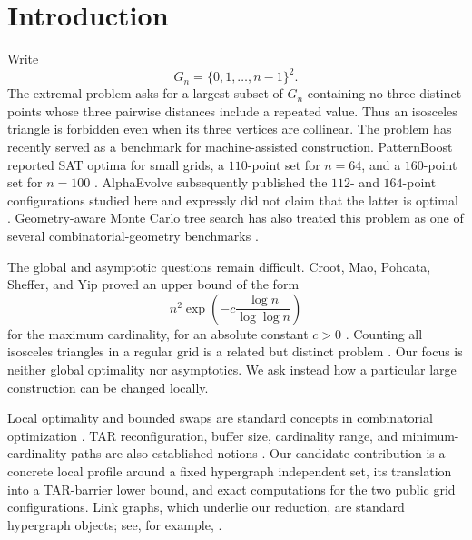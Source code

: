 \documentclass[11pt]{article}
\theoremstyle{definition}
\theoremstyle{remark}
\begin{document}
\section{Introduction}

Write
\[
  G_n=\{0,1,\ldots,n-1\}^2.
\]
The extremal problem asks for a largest subset of $G_n$ containing no three
distinct points whose three pairwise distances include a repeated value.
Thus an isosceles triangle is forbidden even when its three vertices are
collinear.  The problem has recently served as a benchmark for machine-assisted
construction.  PatternBoost reported SAT optima for small grids, a
$110$-point set for $n=64$, and a $160$-point set for $n=100$
\cite{charton2024patternboost}.  AlphaEvolve subsequently published the
$112$- and $164$-point configurations studied here and expressly did not claim
that the latter is optimal \cite{georgiev2025exploration,alphaevolve59}.
Geometry-aware Monte Carlo tree search has also treated this problem as one of
several combinatorial-geometry benchmarks \cite{zhang2026geometry}.

The global and asymptotic questions remain difficult.  Croot, Mao, Pohoata,
Sheffer, and Yip proved an upper bound of the form
\[
  n^2\exp\!\left(-c\frac{\log n}{\log\log n}\right)
\]
for the maximum cardinality, for an absolute constant $c>0$
\cite{croot2026largesieve}.  Counting all isosceles triangles in a regular grid
is a related but distinct problem \cite{wu2016counting}.  Our focus is neither
global optimality nor asymptotics.  We ask instead how a particular large
construction can be changed locally.

Local optimality and bounded swaps are standard concepts in combinatorial
optimization \cite{komusiewicz2025local,ganian2026framework}.  TAR
reconfiguration, buffer size, cardinality range, and minimum-cardinality paths
are also established notions
\cite{deberg2016thresholds,bulteau2021parametrization,hoang2026maxmin}.
Our candidate contribution is a concrete local profile around a fixed
hypergraph independent set, its translation into a TAR-barrier lower bound,
and exact computations for the two public grid configurations.  Link graphs,
which underlie our reduction, are standard hypergraph objects; see, for
example, \cite{hancock2016solutionfree}.
\end{document}
